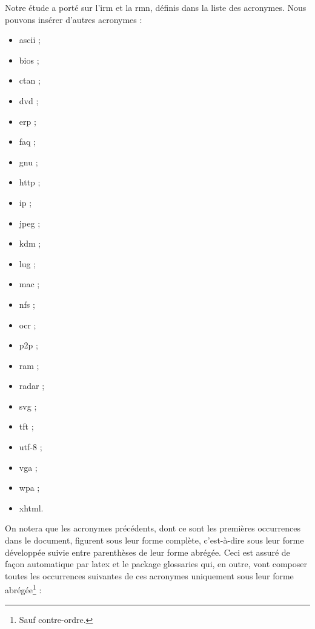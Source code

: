 Notre étude a porté sur l'\gls{irm} et la \gls{rmn}, définis dans la
liste des acronymes. Nous pouvons insérer d'autres
acronymes :
\begin{itemize}
\item \gls{ascii} ;
\item \gls{bios} ;
\item \gls{ctan} ;
\item \gls{dvd} ;
\item \gls{erp} ;
\item \gls{faq} ;
\item \gls{gnu} ;
\item \gls{http} ;
\item \gls{ip} ;
\item \gls{jpeg} ;
\item \gls{kdm} ;
\item \gls{lug} ;
\item \gls{mac} ;
\item \gls{nfs} ;
\item \gls{ocr} ;
\item \gls{p2p} ;
\item \gls{ram} ;
\item \gls{radar} ;
\item \gls{svg} ;
\item \gls{tft} ;
\item \gls{utf-8} ;
\item \gls{vga} ;
\item \gls{wpa} ;
\item \gls{xhtml}.
\end{itemize}
On notera que les acronymes précédents, dont ce sont les premières
occurrences dans le document, figurent sous leur forme complète,
c'est-à-dire sous leur forme développée suivie entre parenthèses de
leur forme abrégée. Ceci est assuré de façon automatique par
\gls{latex} et le package \textsf{glossaries} qui, en outre, vont
composer toutes les occurrences suivantes de ces acronymes
uniquement sous leur forme abrégée\footnote{Sauf contre-ordre.} :
